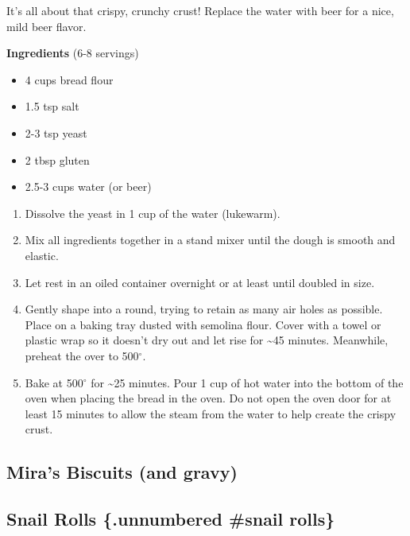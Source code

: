 \documentclass[
]{book}
\providecommand{\tightlist}{%
  \setlength{\itemsep}{0pt}\setlength{\parskip}{0pt}}
\begin{document}
It's all about that crispy, crunchy crust! Replace the water with beer for a nice, mild beer flavor.

\begin{blackbox}

\textbf{Ingredients} (6-8 servings)

\begin{itemize}
\tightlist
\item
  4 cups bread flour
\item
  1.5 tsp salt
\item
  2-3 tsp yeast
\item
  2 tbsp gluten
\item
  2.5-3 cups water (or beer)
\end{itemize}

\end{blackbox}

\begin{enumerate}
\def\labelenumi{\arabic{enumi}.}
\item
  Dissolve the yeast in 1 cup of the water (lukewarm).
\item
  Mix all ingredients together in a stand mixer until the dough is smooth and elastic.
\item
  Let rest in an oiled container overnight or at least until doubled in size.
\item
  Gently shape into a round, trying to retain as many air holes as possible. Place on a baking tray dusted with semolina flour. Cover with a towel or plastic wrap so it doesn't dry out and let rise for \textasciitilde45 minutes. Meanwhile, preheat the over to 500\(^\circ\).
\item
  Bake at 500\(^\circ\) for \textasciitilde25 minutes. Pour 1 cup of hot water into the bottom of the oven when placing the bread in the oven. Do not open the oven door for at least 15 minutes to allow the steam from the water to help create the crispy crust.
\end{enumerate}

\hypertarget{biscuits}{%
\subsection*{Mira's Biscuits (and gravy)}\label{biscuits}}

\hypertarget{snail-rolls-.unnumbered-snail-rolls}{%
\subsection{Snail Rolls \{.unnumbered \#snail rolls\}}\label{snail-rolls-.unnumbered-snail-rolls}}
\end{document}
